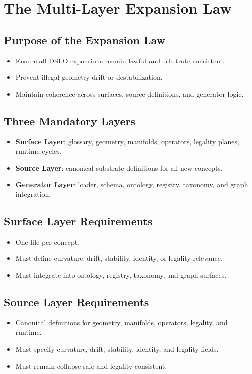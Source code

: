 \section{The Multi-Layer Expansion Law}

\subsection{Purpose of the Expansion Law}
\begin{itemize}
    \item Ensure all DSLO expansions remain lawful and substrate-consistent.
    \item Prevent illegal geometry drift or destabilization.
    \item Maintain coherence across surfaces, source definitions, and generator logic.
\end{itemize}

\subsection{Three Mandatory Layers}
\begin{itemize}
    \item \textbf{Surface Layer}: glossary, geometry, manifolds, operators, legality planes, runtime cycles.
    \item \textbf{Source Layer}: canonical substrate definitions for all new concepts.
    \item \textbf{Generator Layer}: loader, schema, ontology, registry, taxonomy, and graph integration.
\end{itemize}

\subsection{Surface Layer Requirements}
\begin{itemize}
    \item One file per concept.
    \item Must define curvature, drift, stability, identity, or legality relevance.
    \item Must integrate into ontology, registry, taxonomy, and graph surfaces.
\end{itemize}

\subsection{Source Layer Requirements}
\begin{itemize}
    \item Canonical definitions for geometry, manifolds, operators, legality, and runtime.
    \item Must specify curvature, drift, stability, identity, and legality fields.
    \item Must remain collapse-safe and legality-consistent.
\end{itemize}

